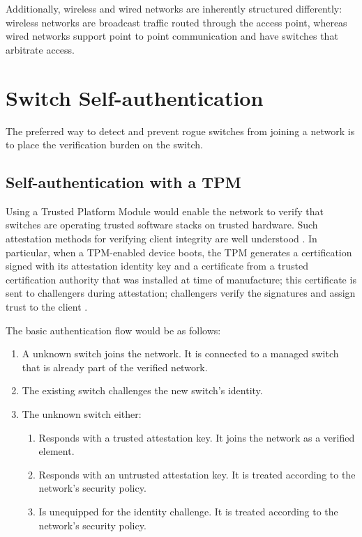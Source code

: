 \documentclass[journal]{IEEEtran}
\begin{document}
Additionally, wireless and wired networks are inherently structured differently: wireless networks
are broadcast traffic routed through the access point, whereas wired networks support point to
point communication and have switches that arbitrate access.



\section{Switch Self-authentication}
The preferred way to detect and prevent rogue switches from joining a network is to place the
verification burden on the switch.

\subsection{Self-authentication with a TPM}
Using a Trusted Platform Module would enable the network to
verify that switches are operating trusted software stacks on trusted hardware. Such attestation
methods for verifying client integrity are well understood \cite{b6}. In particular, when a
TPM-enabled device boots, the TPM generates a certification signed with its attestation identity
key and a certificate from a trusted certification authority that was installed at time of
manufacture; this certificate is sent to challengers during attestation; challengers verify the
signatures and assign trust to the client \cite{b7}.

The basic authentication flow would be as follows:
\begin{enumerate}
  \item A unknown switch joins the network. It is connected to a managed switch that is already
  part of the verified network.
  \item The existing switch challenges the new switch's identity.
  \item The unknown switch either:
  \begin{enumerate}
    \item Responds with a trusted attestation key. It joins the network as a verified element.
    \item Responds with an untrusted attestation key. It is treated according to the network's
    security policy.
    \item Is unequipped for the identity challenge. It is treated according to the network's
    security policy.
  \end{enumerate}
\end{enumerate}
\end{document}
